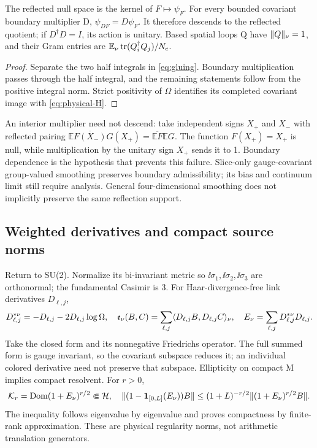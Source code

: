 \begin{proposition}
The reflected null space is the kernel of $F\mapsto\psi_F$.
For every bounded covariant boundary multiplier D,
$\psi_{DF}=D\psi_F$. It therefore descends to the reflected quotient;
if $D^\dagger D=I$, its action is unitary. Based spatial loops Q have
$\lVert Q\rVert_\nu=1$, and their Gram entries are
$\mathbb E_\nu\operatorname{tr}(Q_i^\dagger Q_j)/N_c$.
\end{proposition}
\begin{proof}
Separate the two half integrals in \eqref{eq:gluing}. Boundary
multiplication passes through the half integral, and the remaining
statements follow from the positive integral norm. Strict positivity
of $\Omega$ identifies its completed covariant image with
\eqref{eq:physical-H}.
\end{proof}
An interior multiplier need not descend: take independent signs $X_+$
and $X_-$ with reflected pairing
$\mathbb E\overline{F(X_-)}G(X_+)=\overline{\mathbb EF}\mathbb EG$.
The function $F(X_+)=X_+$ is null, while multiplication by the unitary
sign $X_+$ sends it to 1. Boundary dependence is the hypothesis that
prevents this failure. Slice-only gauge-covariant group-valued smoothing
preserves boundary admissibility; its bias and continuum limit still
require analysis. General four-dimensional smoothing does not
implicitly preserve the same reflection support.

\subsection{Weighted derivatives and compact source norms}
Return to SU(2). Normalize its bi-invariant metric so
$\ii\sigma_1,\ii\sigma_2,\ii\sigma_3$ are orthonormal; the fundamental
Casimir is 3. For Haar-divergence-free link derivatives $D_{\ell,j}$,
\begin{equation}\label{eq:electric}
D_{\ell,j}^{*\nu}=-D_{\ell,j}-2D_{\ell,j}\log\Omega,
\quad \mathfrak e_\nu(B,C)=\sum_{\ell,j}\langle D_{\ell,j}B,D_{\ell,j}C\rangle_\nu,
\quad E_\nu=\sum_{\ell,j}D_{\ell,j}^{*\nu}D_{\ell,j}.
\end{equation}
Take the closed form and its nonnegative Friedrichs operator. The full
summed form is gauge invariant, so the covariant subspace reduces it;
an individual colored derivative need not preserve that subspace.
Ellipticity on compact M implies compact resolvent. For $r>0$,
\begin{equation}\label{eq:compact-tail}
\mathcal K_r=\operatorname{Dom}(1+E_\nu)^{r/2}\Subset\mathcal H,
\quad
\lVert (1-\mathbf1_{[0,L]}(E_\nu))B\rVert
\le(1+L)^{-r/2}\lVert (1+E_\nu)^{r/2}B\rVert.
\end{equation}
The inequality follows eigenvalue by eigenvalue and proves compactness
by finite-rank approximation. These are physical regularity norms, not
arithmetic translation generators.

